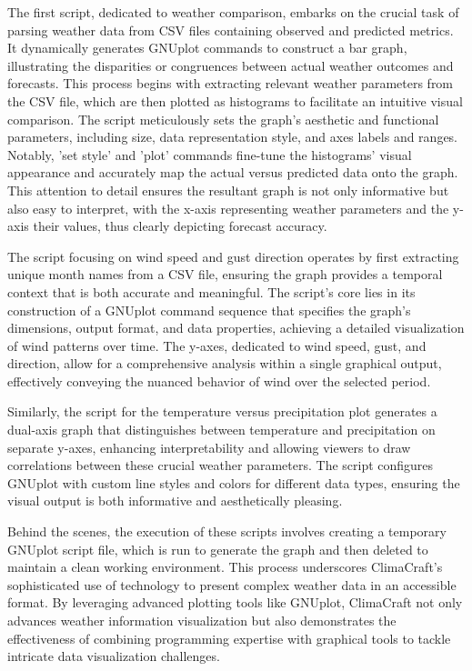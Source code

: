 \documentclass[sn-mathphys-num]{sn-jnl}%
\begin{document}
The first script, dedicated to weather comparison, embarks on the crucial task of parsing weather data from CSV files containing observed and predicted metrics. It dynamically generates GNUplot commands to construct a bar graph, illustrating the disparities or congruences between actual weather outcomes and forecasts. This process begins with extracting relevant weather parameters from the CSV file, which are then plotted as histograms to facilitate an intuitive visual comparison. The script meticulously sets the graph's aesthetic and functional parameters, including size, data representation style, and axes labels and ranges. Notably, 'set style' and 'plot' commands fine-tune the histograms' visual appearance and accurately map the actual versus predicted data onto the graph. This attention to detail ensures the resultant graph is not only informative but also easy to interpret, with the x-axis representing weather parameters and the y-axis their values, thus clearly depicting forecast accuracy.

The script focusing on wind speed and gust direction operates by first extracting unique month names from a CSV file, ensuring the graph provides a temporal context that is both accurate and meaningful. The script's core lies in its construction of a GNUplot command sequence that specifies the graph's dimensions, output format, and data properties, achieving a detailed visualization of wind patterns over time. The y-axes, dedicated to wind speed, gust, and direction, allow for a comprehensive analysis within a single graphical output, effectively conveying the nuanced behavior of wind over the selected period.

Similarly, the script for the temperature versus precipitation plot generates a dual-axis graph that distinguishes between temperature and precipitation on separate y-axes, enhancing interpretability and allowing viewers to draw correlations between these crucial weather parameters. The script configures GNUplot with custom line styles and colors for different data types, ensuring the visual output is both informative and aesthetically pleasing.

Behind the scenes, the execution of these scripts involves creating a temporary GNUplot script file, which is run to generate the graph and then deleted to maintain a clean working environment. This process underscores ClimaCraft's sophisticated use of technology to present complex weather data in an accessible format. By leveraging advanced plotting tools like GNUplot, ClimaCraft not only advances weather information visualization but also demonstrates the effectiveness of combining programming expertise with graphical tools to tackle intricate data visualization challenges.
\end{document}
